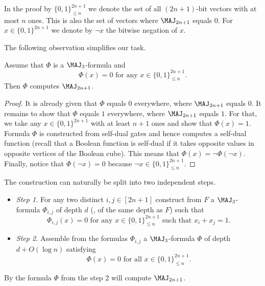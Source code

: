 In the proof by $\{0, 1\}^{2n + 1}_{\le n}$ we denote the set of all $(2n + 1)$-bit vectors with at most $n$ ones. This is also the set of vectors where $\MAJ_{2n + 1}$ equals $0$. For $x\in\{0, 1\}^{2n + 1}$ we denote by $\lnot x$ the %
bitwise   %
negation of $x$.

The following observation simplifies our task.
\begin{observation}
\label{simple_obs}
Assume that $\Phi$ is a $\MAJ_3$-formula and 
\[\Phi(x) = 0 \mbox{ for any } x\in\{0, 1\}^{2n + 1}_{\le n}.\]
Then $\Phi$ computes $\MAJ_{2n + 1}$.
\end{observation}
\begin{proof}
It is already given that $\Phi$ equals $0$ everywhere, where $\MAJ_{2n + 1}$ equals $0$. It remains to show that $\Phi$ equals $1$ everywhere, where $\MAJ_{2n + 1}$ equals $1$. For that, we take any $x\in\{0, 1\}^{2n + 1}$ with at least $n + 1$ ones and show that $\Phi(x) = 1$. Formula $\Phi$ is constructed from self-dual gates and hence computes a self-dual function (recall that a Boolean function is self-dual if it takes opposite values in opposite vertices of the Boolean cube). This means that $\Phi(x) = \lnot \Phi(\lnot x)$. Finally, notice that $\Phi(\lnot x) = 0$ because $\lnot x\in\{0, 1\}^{2n + 1}_{\le n}$.
\end{proof}
%
The construction can naturally be  %
split into two independent steps.

\begin{itemize}
\item \emph{Step 1.} For any two distinct $i, j\in [2n + 1]$ construct from $F$ a $\MAJ_3$-formula $\Phi_{i,j}$ of depth $d$ (\ie, of the same depth as $F$) such that
\[
\Phi_{i,j}(x) = 0 \mbox{ for any } x\in\{0, 1\}^{2n + 1}_{\le n} \mbox{ such that } x_i + x_j = 1.\]
\item \emph{Step 2.} Assemble from the formulas $\Phi_{i,j}$ a $\MAJ_3$-formula $\Phi$ of depth $d + O(\log n)$ satisfying 
\[\Phi(x) = 0 \mbox{ for all } x\in\{0, 1\}^{2n + 1}_{\le n}.\]
\end{itemize}
By  the formula $\Phi$ from the step 2 will compute $\MAJ_{2n + 1}$.

\bigskip

